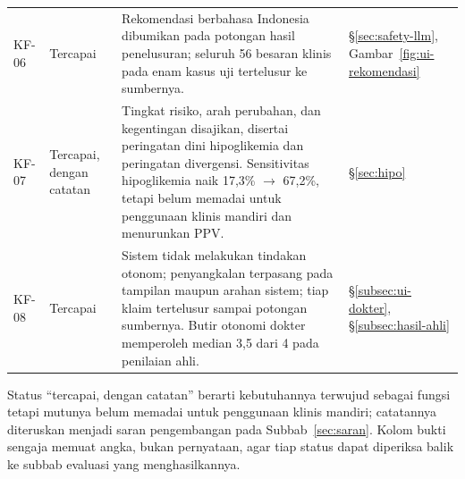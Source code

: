\begin{longtable}{@{}p{1.1cm}>{\raggedright\arraybackslash}p{2.7cm}>{\raggedright\arraybackslash}p{5.6cm}>{\raggedright\arraybackslash}p{2.9cm}@{}}
KF-06 & Tercapai & Rekomendasi berbahasa Indonesia dibumikan pada potongan hasil penelusuran; seluruh 56 besaran klinis pada enam kasus uji tertelusur ke sumbernya. & \S\ref{sec:safety-llm}, Gambar~\ref{fig:ui-rekomendasi} \\[2pt]

KF-07 & Tercapai, dengan catatan & Tingkat risiko, arah perubahan, dan kegentingan disajikan, disertai peringatan dini hipoglikemia dan peringatan divergensi. Sensitivitas hipoglikemia naik 17,3\% $\rightarrow$ 67,2\%, tetapi belum memadai untuk penggunaan klinis mandiri dan menurunkan PPV. & \S\ref{sec:hipo} \\[2pt]

KF-08 & Tercapai & Sistem tidak melakukan tindakan otonom; penyangkalan terpasang pada tampilan maupun arahan sistem; tiap klaim tertelusur sampai potongan sumbernya. Butir otonomi dokter memperoleh median 3,5 dari 4 pada penilaian ahli. & \S\ref{subsec:ui-dokter}, \S\ref{subsec:hasil-ahli} \\

\end{longtable}

\noindent\tabnotestyle Status ``tercapai, dengan catatan'' berarti kebutuhannya terwujud sebagai fungsi tetapi mutunya belum memadai untuk penggunaan klinis mandiri; catatannya diteruskan menjadi saran pengembangan pada Subbab~\ref{sec:saran}. Kolom bukti sengaja memuat angka, bukan pernyataan, agar tiap status dapat diperiksa balik ke subbab evaluasi yang menghasilkannya.
